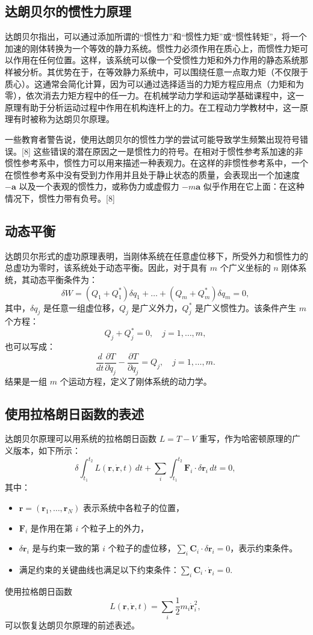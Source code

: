 \subsection{达朗贝尔的惯性力原理}
达朗贝尔指出，可以通过添加所谓的“惯性力”和“惯性力矩”或“惯性转矩”，将一个加速的刚体转换为一个等效的静力系统。惯性力必须作用在质心上，而惯性力矩可以作用在任何位置。这样，该系统可以像一个受惯性力矩和外力作用的静态系统那样被分析。其优势在于，在等效静力系统中，可以围绕任意一点取力矩（不仅限于质心）。这通常会简化计算，因为可以通过选择适当的力矩方程应用点（力矩和为零），依次消去力矩方程中的任一力。在机械学动力学和运动学基础课程中，这一原理有助于分析运动过程中作用在机构连杆上的力。在工程动力学教材中，这一原理有时被称为达朗贝尔原理。

一些教育者警告说，使用达朗贝尔的惯性力学的尝试可能导致学生频繁出现符号错误。[8] 这些错误的潜在原因之一是惯性力的符号。在相对于惯性参考系加速的非惯性参考系中，惯性力可以用来描述一种表观力。在这样的非惯性参考系中，一个在惯性参考系中没有受到力作用并且处于静止状态的质量，会表现出一个加速度 \(-\mathbf{a}\) 以及一个表观的惯性力，或称伪力或虚假力 \(-m\mathbf{a}\) 似乎作用在它上面：在这种情况下，惯性力带有负号。[8]
\subsection{动态平衡}
达朗贝尔形式的虚功原理表明，当刚体系统在任意虚位移下，所受外力和惯性力的总虚功为零时，该系统处于动态平衡。因此，对于具有 \( m \) 个广义坐标的 \( n \) 刚体系统，其动态平衡条件为：
\[
\delta W = \left(Q_1 + Q_1^{*}\right) \delta q_1 + \dots + \left(Q_m + Q_m^{*}\right) \delta q_m = 0,~
\]
其中，\( \delta q_j \) 是任意一组虚位移，\( Q_j \) 是广义外力，\( Q_j^{*} \) 是广义惯性力。该条件产生 \( m \) 个方程：
\[
Q_j + Q_j^{*} = 0, \quad j = 1, \dots, m,~
\]
也可以写成：
\[
\frac{d}{dt} \frac{\partial T}{\partial \dot{q}_j} - \frac{\partial T}{\partial q_j} = Q_j, \quad j = 1, \dots, m.~
\]
结果是一组 \( m \) 个运动方程，定义了刚体系统的动力学。
\subsection{使用拉格朗日函数的表述}
达朗贝尔原理可以用系统的拉格朗日函数 \( L = T - V \) 重写，作为哈密顿原理的广义版本，如下所示：
\[
\delta \int_{t_1}^{t_2} L(\mathbf{r}, \dot{\mathbf{r}}, t) \, dt + \sum_i \int_{t_1}^{t_2} \mathbf{F}_i \cdot \delta \mathbf{r}_i \, dt = 0,~
\]
其中：
\begin{itemize}
\item \( \mathbf{r} = (\mathbf{r}_1, \dots, \mathbf{r}_N) \) 表示系统中各粒子的位置，
\item \( \mathbf{F}_i \) 是作用在第 \( i \) 个粒子上的外力，
\item \( \delta \mathbf{r}_i \) 是与约束一致的第 \( i \) 个粒子的虚位移，\( \sum_i \mathbf{C}_i \cdot \delta \mathbf{r}_i = 0 \)，表示约束条件。
\item 满足约束的关键曲线也满足以下约束条件：\(\sum_i \mathbf{C}_i \cdot \dot{\mathbf{r}}_i = 0.\)
\end{itemize}
使用拉格朗日函数
\[
L(\mathbf{r}, \dot{\mathbf{r}}, t) = \sum_i \frac{1}{2} m_i \dot{\mathbf{r}}_i^2,~
\]
可以恢复达朗贝尔原理的前述表述。
